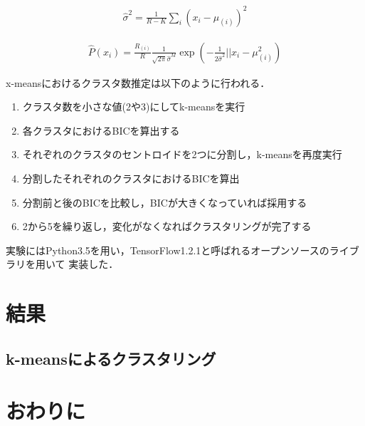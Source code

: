\documentclass[10pt,a4j,twocolumn]{ltjsarticle}
\begin{document}
\begin{align}
  \hat{\sigma}^2 = \frac{1}{R-K}\sum_i\left(x_i - \mu_{(i)}\right)^2
\end{align}

\begin{align}
  \hat{P}(x_i) = \frac{R_{(i)}}{R}\frac{1}{\sqrt{2\pi}\hat{\sigma}^M}
    \exp\left(-\frac{1}{2\hat{\sigma}^2}||x_i-\mu_{(i)}^2\right)
\end{align}

x-meansにおけるクラスタ数推定は以下のように行われる．
\begin{enumerate}
  \item クラスタ数を小さな値(2や3)にしてk-meansを実行
  \item 各クラスタにおけるBICを算出する
  \item それぞれのクラスタのセントロイドを2つに分割し，k-meansを再度実行
  \item 分割したそれぞれのクラスタにおけるBICを算出
  \item 分割前と後のBICを比較し，BICが大きくなっていれば採用する
  \item 2から5を繰り返し，変化がなくなればクラスタリングが完了する
\end{enumerate}

実験にはPython3.5を用い，TensorFlow1.2.1と呼ばれるオープンソースのライブラリを用いて
実装した．

\section{結果}
\subsection{k-meansによるクラスタリング}

\section{おわりに}

\printbibliography[title=参考文献]
\end{document}
